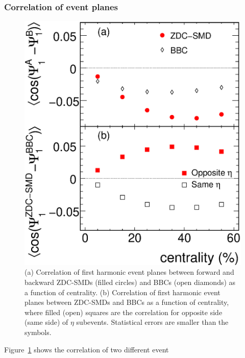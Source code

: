 \documentclass[aps,prc,superscriptaddress,showpacs,floatfix,twocolumn]{revtex4}
\begin{document}
\subsubsection{Correlation of event planes}
\label{subsubsec:correlation_eventplanes}
\begin{figure}[tbh]
\includegraphics[width=1.0\linewidth]{correlation_zdc-smd_bbc_1storder.eps}
\caption{\label{fig:correlation_zdc-smd_bbc_1storder}
(a) Correlation of first harmonic event planes between forward and backward 
ZDC-SMDs (filled circles) and BBCs (open diamonds) as a function of centrality.
(b) Correlation of first harmonic event planes between ZDC-SMDs and BBCs as a 
function of centrality, where filled (open) squares are the correlation for opposite side 
(same side) of $\eta$ subevents. Statistical errors are smaller than the symbols.
}
\end{figure}
Figure~\ref{fig:correlation_zdc-smd_bbc_1storder} shows the correlation of two different event 
\end{document}
